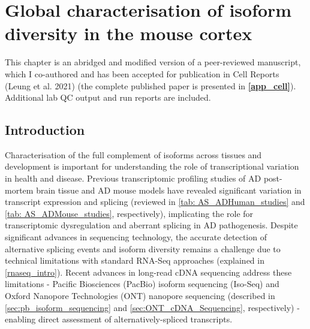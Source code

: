 \chapter{Global characterisation of isoform diversity in the mouse cortex}
\label{ch: whole_transcriptome}


This chapter is an abridged and modified version of a peer-reviewed manuscript, which I co-authored and has been accepted for publication in Cell Reports (Leung et al. 2021)\cite{KayLeung2021} (the complete published paper is presented in \textbf{\cref{app_cell}}). Additional lab QC output and run reports are included. 

\section{Introduction}
Characterisation of the full complement of isoforms across tissues and development is important for understanding the role of transcriptional variation in health and disease. Previous transcriptomic profiling studies of AD post-mortem brain tissue and AD mouse models have revealed significant variation in transcript expression and splicing (reviewed in \cref{tab: AS_ADHuman_studies} and \cref{tab: AS_ADMouse_studies}, respectively), implicating the role for transcriptomic dysregulation and aberrant splicing in AD pathogenesis\cite{Raj2018}. Despite significant advances in sequencing technology, the accurate detection of alternative splicing events and isoform diversity remains a challenge due to technical limitations with standard RNA-Seq approaches (explained in \cref{rnaseq_intro}). Recent advances in long-read cDNA sequencing address these limitations - Pacific Biosciences (PacBio) isoform sequencing (Iso-Seq) and Oxford Nanopore Technologies (ONT) nanopore sequencing (described in \cref{sec:pb_isoform_sequencing} and \cref{sec:ONT_cDNA_Sequencing}, respectively) - enabling direct assessment of alternatively-spliced transcripts\cite{Amarasinghe2020}.

